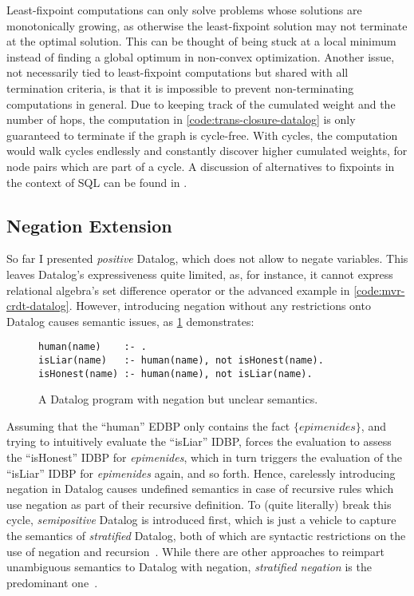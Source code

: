 Least-fixpoint computations can only solve problems whose solutions
are monotonically growing, as otherwise the least-fixpoint solution may not
terminate at the optimal solution.
This can be thought of being stuck at a local minimum instead of finding
a global optimum in non-convex optimization.
Another issue, not necessarily tied to least-fixpoint computations but shared
with all termination criteria, is that it is impossible to prevent
non-terminating computations in general.
Due to keeping track of the cumulated weight and the number of hops,
the computation in \ref{code:trans-closure-datalog} is only guaranteed to terminate
if the graph is cycle-free.
With cycles, the computation would walk cycles endlessly and constantly discover
higher cumulated weights, for node pairs which are part of a cycle.
A discussion of alternatives to fixpoints in the context of SQL
can be found in \cite{hirn2023fix}.

\subsection{Negation Extension}\label{sec:datalog-negation}

So far I presented \emph{positive} Datalog, which does not allow to negate
variables.
This leaves Datalog's expressiveness quite limited, as, for instance, it cannot
express relational algebra's set difference operator or the advanced
example in \ref{code:mvr-crdt-datalog}.
However, introducing negation without any restrictions onto Datalog causes
semantic issues, as \ref{code:negative-datalog-issue} demonstrates:

\begin{figure}[htpb]
	\centering
	\begin{lstlisting}[keepspaces]
human(name)    :- .
isLiar(name)   :- human(name), not isHonest(name).
isHonest(name) :- human(name), not isLiar(name).
\end{lstlisting}
	\caption{A Datalog program with negation but unclear semantics.}\label{code:negative-datalog-issue}
\end{figure}

Assuming that the ``human'' \ac{EDBP} only contains the fact
\(\{ \mathit{epimenides} \}\)\footnotemark{}, and trying to intuitively evaluate the
``isLiar'' \ac{IDBP}, forces the evaluation to assess the ``isHonest'' \ac{IDBP}
for \textit{epimenides}, which in turn triggers the evaluation of the
``isLiar'' \ac{IDBP} for \textit{epimenides} again, and so forth.
Hence, carelessly introducing negation in Datalog causes undefined semantics
in case of recursive rules which use negation as part of their recursive definition.
To (quite literally) break this cycle, \emph{semipositive} Datalog is introduced
first, which is just a vehicle to capture the semantics of \emph{stratified}
Datalog, both of which are syntactic restrictions on the use of negation and
recursion~\cite{green2013datalog}.
While there are other approaches to reimpart unambiguous semantics to
Datalog with negation, \emph{stratified negation} is the predominant
one~\cite{green2013datalog}.


